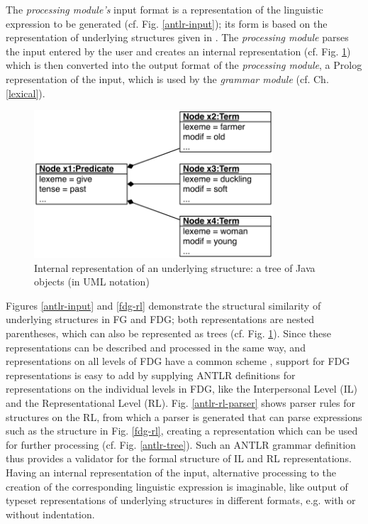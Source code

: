 \documentclass[a4paper, halfparskip, onecolumn, abstractoff, final]{scrartcl}
\begin{document}
The \emph{processing module's} input format is a representation of the linguistic expression to be generated (cf. Fig. \ref{antlr-input}); its form is based on the representation of underlying structures given in \cite{Dik1997a}. The \emph{processing module} parses the input entered by the user and creates an internal representation (cf. Fig. \ref{uml-tree}) which is then converted into the output format of the \emph{processing module}, a Prolog representation of the input, which is used by the \emph{grammar module} (cf. Ch. \ref{lexical}).

\begin{figure}
\begin{center}
\mbox{\includegraphics[height=5.5cm]{objects.pdf}}
\caption{Internal representation of an underlying structure: a tree of Java objects (in UML notation)}
\label{uml-tree}
\end{center}
\end{figure}
    
Figures \ref{antlr-input} and \ref{fdg-rl} demonstrate the structural similarity of underlying structures in FG and FDG; both representations are nested parentheses, which can also be represented as trees (cf. Fig. \ref{uml-tree}). Since these representations can be described and processed in the same way, and representations on all levels of FDG have a common scheme \citep[671]{HengeveldAndMackenzie2006}, support for FDG representations is easy to add by supplying ANTLR definitions for representations on the individual levels in FDG, like the Interpersonal Level (IL) and the Representational Level (RL). Fig. \ref{antlr-rl-parser} shows parser rules for structures on the RL, from which a parser is generated that can parse expressions such as the structure in Fig. \ref{fdg-rl}, creating a representation which can be used for further processing (cf. Fig. \ref{antlr-tree}). Such an ANTLR grammar definition thus provides a validator for the formal structure of IL and RL representations. Having an internal representation of the input, alternative processing to the creation of the corresponding linguistic expression is imaginable, like output of typeset representations of underlying structures in different formats, e.g. with or without indentation.
\end{document}
